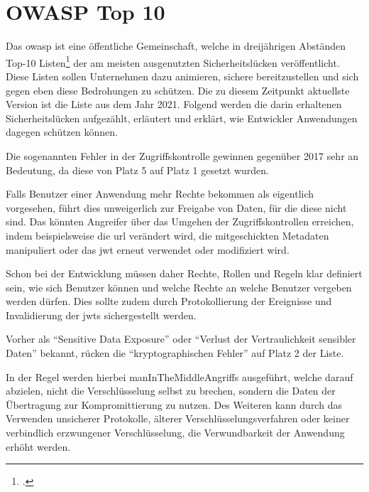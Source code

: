 \section{OWASP Top 10}\label{sec:owasp}
	Das \gls{owasp} ist eine öffentliche Gemeinschaft,
	welche in dreijährigen Abständen Top-10 Listen\footcite[Vgl.][]{owasp_top_ten} der
	am meisten ausgenutzten Sicherheitslücken veröffentlicht.
	Diese Listen sollen Unternehmen dazu animieren,
	sichere \webApplications{} bereitzustellen und sich gegen eben diese Bedrohungen zu schützen.
	Die zu diesem Zeitpunkt aktuellste Version ist die Liste aus dem Jahr 2021.
	Folgend werden die darin erhaltenen Sicherheitslücken aufgezählt,
	erläutert und erklärt, wie Entwickler Anwendungen dagegen schützen können.

	Die sogenannten Fehler in der Zugriffskontrolle gewinnen gegenüber 2017 sehr an Bedeutung,
	da diese von Platz 5 auf Platz 1 gesetzt wurden.

	Falls Benutzer einer Anwendung mehr Rechte bekommen als eigentlich vorgesehen,
	führt dies unweigerlich zur Freigabe von Daten,
	für die diese nicht  sind.
	Das könnten Angreifer über das Umgehen der Zugriffskontrollen erreichen,
	indem beispielsweise die \gls{url} verändert wird,
	die mitgeschickten Metadaten manipuliert oder das \gls{jwt} erneut verwendet oder modifiziert wird.

	Schon bei der Entwicklung müssen daher Rechte,
	Rollen und Regeln klar definiert sein,
	wie sich Benutzer  können und
	welche Rechte an welche Benutzer vergeben werden dürfen.
	Dies sollte zudem durch Protokollierung der Ereignisse und
	Invalidierung der \glspl{jwt} sichergestellt werden.

	\newpage

	Vorher als \enquote{Sensitive Data Exposure}
	oder \enquote{Verlust der Vertraulichkeit sensibler Daten} bekannt,
	rücken die \enquote{kryptographischen Fehler} auf Platz 2 der Liste.

	In der Regel werden hierbei \glspl{manInTheMiddleAngriff} ausgeführt,
	welche darauf abzielen, nicht die Verschlüsselung selbst zu brechen,
	sondern die Daten der Übertragung zur Kompromittierung zu nutzen.
	Des Weiteren kann durch das Verwenden unsicherer Protokolle,
	älterer Verschlüsselungsverfahren oder keiner verbindlich erzwungener Verschlüsselung,
	die Verwundbarkeit der Anwendung erhöht werden.

